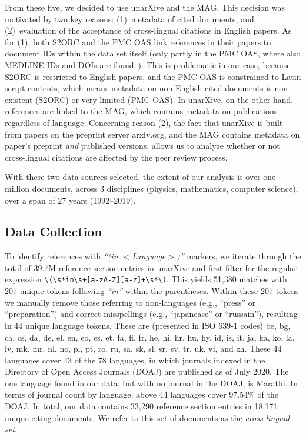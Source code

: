From these five, we decided to use unarXive and the MAG. This decision was motivated by two key reasons: (1)~metadata of cited documents, and (2)~evaluation of the acceptance of cross-lingual citations in English papers. As for (1), both S2ORC and the PMC OAS link references in their papers to document IDs within the data set itself (only partly in the PMC OAS, where also MEDLINE IDs and DOIs are found~\cite{Gipp2015}). This is problematic in our case, because S2ORC is restricted to English papers, and the PMC OAS is constrained to Latin script contents, which means metadata on non-English cited documents is non-existent (S2ORC) or very limited (PMC OAS). In unarXive, on the other hand, references are linked to the MAG, which contains metadata on publications regardless of language. Concerning reason (2), the fact that unarXive is built from papers on the preprint server arxiv.org, and the MAG contains metadata on paper's preprint \emph{and} published versions, allows us to analyze whether or not cross-lingual citations are affected by the peer review process.

With these two data sources selected, the extent of our analysis is over one million documents, across 3 disciplines (physics, mathematics, computer science), over a span of 27 years (1992--2019).

\subsection{Data Collection}\label{sec:datacollectionsub}
To identify references with \textit{``(in $<$Language$>$)''} markers, we iterate through the total of 39.7M reference section entries in unarXive and first filter for the regular expression \verb|\(\s*in\s+[a-zA-Z][a-z]+\s*\)|. This yields 51,380 matches with 207 unique tokens following \textit{``in''} within the parentheses. Within these 207 tokens we manually remove those referring to non-languages (e.g., ``press'' or ``preparation'') and correct misspellings (e.g., ``japanease'' or ``russain''), resulting in 44 unique language tokens. These are (presented in ISO 639-1 codes) be, bg, ca, cs, da, de, el, en, eo, es, et, fa, fi, fr, he, hi, hr, hu, hy, id, is, it, ja, ka, ko, la, lv, mk, mr, nl, no, pl, pt, ro, ru, sa, sk, sl, sr, sv, tr, uk, vi, and zh. These 44 languages cover 43 of the 78 languages, in which journals indexed in the Directory of Open Access Journals (DOAJ) are published as of July 2020. The one language found in our data, but with no journal in the DOAJ, is Marathi. In terms of journal count by language, above 44 languages cover 97.54\% of the DOAJ. In total, our data contains 33,290 reference section entries in 18,171 unique citing documents. We refer to this set of documents as the \emph{cross-lingual set}.

